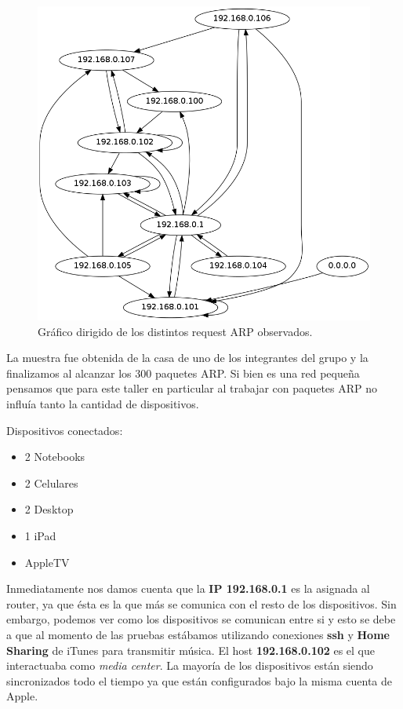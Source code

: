 \documentclass[a4paper]{article}
\begin{document}
\begin{figure}[H]
  \centering
  \includegraphics[scale=0.30]{graficos/arpGraph.png}
  \caption{Gráfico dirigido de los distintos request ARP observados.}
\end{figure}

 
La muestra fue obtenida de la casa de uno de los integrantes del grupo y la finalizamos al alcanzar los 300 paquetes ARP.  
Si bien es una red pequeña pensamos que para este taller en particular al trabajar con paquetes ARP no influía tanto la cantidad de dispositivos.

Dispositivos conectados:
\begin{itemize}
  \item 2 Notebooks
  \item 2 Celulares
  \item 2 Desktop
  \item 1 iPad
  \item AppleTV
\end{itemize}

Inmediatamente nos damos cuenta que la \textbf{IP 192.168.0.1} es la asignada al router, ya que ésta es la que más se comunica con el resto de los dispositivos. Sin embargo, podemos ver como los dispositivos se comunican entre si y esto se debe a que al momento de las pruebas estábamos utilizando conexiones \textbf{ssh} y \textbf{Home Sharing} de iTunes para transmitir música.
El host \textbf{192.168.0.102} es el que interactuaba como \textit{media center}. La mayoría de los dispositivos están siendo sincronizados todo el tiempo ya que están configurados bajo la misma cuenta de Apple.
\end{document}
